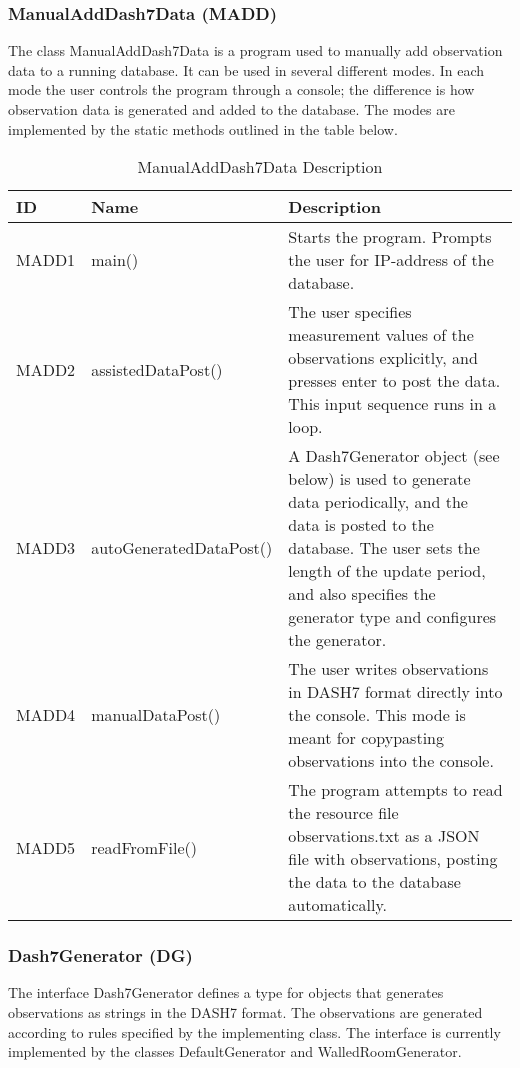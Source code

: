 \documentclass[../document]{subfiles}
\begin{document}
\subsubsection{ManualAddDash7Data (MADD)}
The class ManualAddDash7Data is a program used to manually add observation data to a running database. It can be used in several different modes. In each mode the user controls the program through a console; the difference is how observation data is generated and added to the database. The modes are implemented by the static methods outlined in the table below.

\begin{table}[H]
\caption{ManualAddDash7Data Description}
\centering
\begin{tabularx}{\textwidth}{|l|l|X|}
\hline 
ID
&Name
&Description
\\ \hline MADD1
&main()
&Starts the program. Prompts the user for IP-address of the database.
\\ \hline MADD2
&assistedDataPost()
&The user specifies measurement values of the observations explicitly, and presses enter to post the data. This input sequence runs in a loop.
\\ \hline MADD3
&autoGeneratedDataPost()
&A Dash7Generator object (see below) is used to generate data periodically, and the data is posted to the database. The user sets the length of the update period, and also specifies the generator type and configures the generator.
\\ \hline MADD4
&manualDataPost()
&The user writes observations in DASH7 format directly into the console. This mode is meant for copypasting observations into the console.
\\ \hline MADD5
&readFromFile()
&The program attempts to read the resource file observations.txt as a JSON file with observations, posting the data to the database automatically.

\\ \hline 
\end{tabularx}
\end{table}

\subsubsection{Dash7Generator (DG)}
The interface Dash7Generator defines a type for objects that generates observations as strings in the DASH7 format. The observations are generated according to rules specified by the implementing class. The interface is currently implemented by the classes DefaultGenerator and WalledRoomGenerator.
\end{document}
